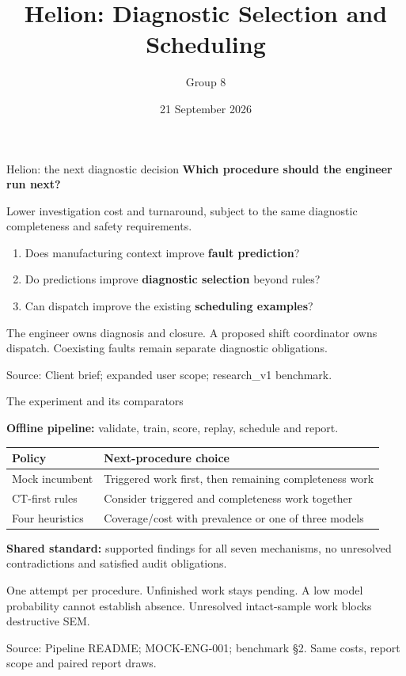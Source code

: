 \documentclass[aspectratio=169,11pt]{beamer}
\title{Helion: Diagnostic Selection and Scheduling}
\author{Group 8}
\date{21 September 2026}
\newcommand{\lead}[1]{{\large\bfseries #1}\par\medskip}
\newcommand{\source}[1]{\vfill{\fontsize{6.6}{8}\selectfont\color{Muted}Source: #1\par}}
\newcommand{\smalltext}[1]{{\fontsize{9}{11.4}\selectfont #1\par}}
\begin{document}
\begin{frame}[t]{Helion: the next diagnostic decision}
  \lead{Which procedure should the engineer run next?}
  Lower investigation cost and turnaround, subject to the same
  diagnostic completeness and safety requirements.

  \vspace{4mm}
  \begin{enumerate}
    \setlength{\itemsep}{2mm}
    \item Does manufacturing context improve \textbf{fault prediction}?
    \item Do predictions improve \textbf{diagnostic selection} beyond rules?
    \item Can dispatch improve the existing \textbf{scheduling examples}?
  \end{enumerate}
  \vspace{3mm}
  \smalltext{The engineer owns diagnosis and closure. A proposed shift coordinator owns dispatch. Coexisting faults remain separate diagnostic obligations.}
  \source{Client brief; expanded user scope; research\_v1 benchmark.}
  \note{\SlideOneNotes}
\end{frame}

\begin{frame}[t]{The experiment and its comparators}
  \smalltext{\textbf{Offline pipeline:} validate, train, score, replay, schedule and report.}
  \vspace{2mm}
  \begin{tabularx}{\textwidth}{@{}p{3.3cm}Y@{}}
    \toprule
    \textbf{Policy} & \textbf{Next-procedure choice} \\
    \midrule
    Mock incumbent & Triggered work first, then remaining completeness work \\
    CT-first rules & Consider triggered and completeness work together \\
    Four heuristics & Coverage/cost with prevalence or one of three models \\
    \bottomrule
  \end{tabularx}\par
  \vspace{3mm}
  \smalltext{\textbf{Shared standard:} supported findings for all seven mechanisms,
  no unresolved contradictions and satisfied audit obligations.}
  \vspace{1.5mm}
  \smalltext{One attempt per procedure. Unfinished work stays pending.
  A low model probability cannot establish absence.
  Unresolved intact-sample work blocks destructive SEM.}
  \source{Pipeline README; MOCK-ENG-001; benchmark \S2. Same costs, report scope and paired report draws.}
  \note{\SlideTwoNotes}
\end{frame}
\end{document}
